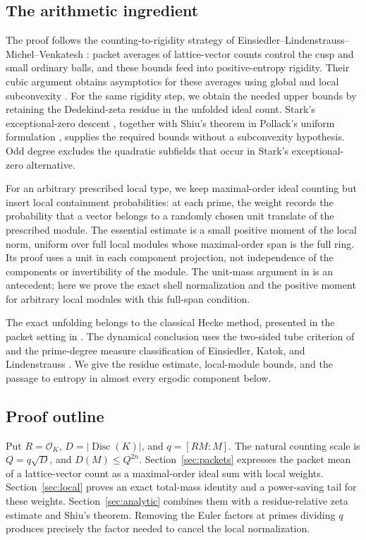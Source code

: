 \documentclass[11pt]{article}
\theoremstyle{remark}
\DeclareMathOperator{\Disc}{Disc}
\newcommand{\cO}{\mathcal O}
\numberwithin{equation}{section}
\begin{document}
\subsection*{The arithmetic ingredient}

The proof follows the counting-to-rigidity strategy of
Einsiedler--Lindenstrauss--Michel--Venkatesh
\cite[Section~2.7.1]{ELMV2011}: packet averages of lattice-vector
counts control the cusp and small ordinary balls, and these bounds
feed into positive-entropy rigidity. Their cubic argument obtains
asymptotics for these averages using global and local subconvexity
\cite[Sections~2.7.2--2.7.3]{ELMV2011}. For the same rigidity step,
we obtain the needed upper bounds by retaining the Dedekind-zeta
residue in the unfolded ideal count. Stark's exceptional-zero descent
\cite{Stark1974}, together with Shiu's theorem in Pollack's uniform
formulation \cite{Shiu1980,Pollack2020}, supplies the required bounds
without a subconvexity hypothesis. Odd degree excludes the quadratic
subfields that occur in Stark's exceptional-zero alternative.

For an arbitrary prescribed local type, we keep maximal-order ideal
counting but insert local containment probabilities: at each prime,
the weight records the probability that a vector belongs to a randomly
chosen unit translate of the prescribed module.
The essential estimate is a small positive moment of the local norm,
uniform over full local modules whose maximal-order span is the full
ring. Its proof uses a unit in each component projection, not
independence of the components or invertibility of the module.
The unit-mass argument in \cite[Lemma~9.7]{ELMV2011} is an antecedent;
here we prove the exact shell normalization and the positive moment
for arbitrary local modules with this full-span condition.

The exact unfolding belongs to the classical Hecke method, presented
in the packet setting in \cite[Section~10]{ELMV2011}. The dynamical
conclusion uses the two-sided tube criterion of
\cite[Corollary~3.3]{ELMV2009} and the prime-degree measure
classification of Einsiedler, Katok, and Lindenstrauss
\cite[Corollary~1.4]{EKL2006}. We give the residue estimate,
local-module bounds, and the passage to entropy in almost every
ergodic component below.

\subsection*{Proof outline}

Put $R=\cO_K$, $D=|\Disc(K)|$, and
$q=[RM:M]$. The natural counting scale is $Q=q\sqrt D$, and
$D(M)\le Q^{2n}$. Section~\ref{sec:packets} expresses the packet
mean of a lattice-vector count as a maximal-order ideal sum with
local weights. Section~\ref{sec:local} proves an exact total-mass
identity and a power-saving tail for these weights.
Section~\ref{sec:analytic} combines them with a residue-relative
zeta estimate and Shiu's theorem. Removing the Euler factors at
primes dividing $q$ produces precisely the factor needed to cancel
the local normalization.
\end{document}
